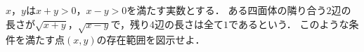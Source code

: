 $x$，$y$は$x+y>0$，$x-y>0$を満たす実数とする．
ある四面体の隣り合う$2$辺の長さが$\sqrt{x+y}$，$\sqrt{x-y}$で，残り$4$辺の長さは全て$1$であるという．
このような条件を満たす点$(x,y)$の存在範囲を図示せよ．
